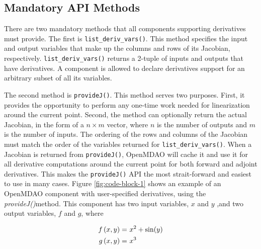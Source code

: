 \documentclass[]{aiaa-tc} %
\begin{document}
        \subsection{Mandatory API Methods}

        There are two mandatory methods that all components supporting derivatives must provide.
        The first is \texttt{list\_deriv\_vars()}. This method specifies the
        input and output variables that make up the columns and rows of its Jacobian, respectively.
        \texttt{list\_deriv\_vars()} returns a 2-tuple of inputs and outputs that have derivatives.
        A component is allowed to declare derivatives support for an arbitrary subset of all its variables.

        The second method is \texttt{provideJ()}. This method serves two purposes. First, it provides the
        opportunity to perform any one-time work needed for linearization around the current point. Second,
        the method can optionally return the actual Jacobian, in the form of a $n \times m$ vector, where $n$ is the
        number of outputs and $m$ is the number of inputs. The ordering of the rows and columns of the Jacobian
        must match the order of the variables returned for \texttt{list\_deriv\_vars()}. When a Jacobian is
        returned from \texttt{provideJ()}, OpenMDAO will cache it and use it for all derivative computations
        around the current point for both forward and adjoint derivatives. This makes the \texttt{provideJ()}
        API the most strait-forward and easiest to use in many cases. Figure \ref{fig:code-block-1} shows
        an example of an OpenMDAO component with user-specified derivatives, using the \textit{provideJ()}method.
        This component has two input variables, $x$ and $y$ ,and two output variables, $f$ and $g$, where

        \begin{align}
            f\left(x, y\right) =&\  x^2 + \sin(y) \\ \notag
            g\left(x, y\right) =&\  x^3
        \end{align}
\end{document}
